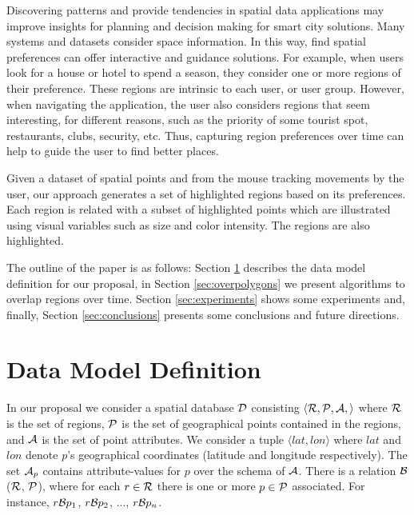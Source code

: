\documentclass[runningheads,a4paper]{llncs}
\begin{document}
\vspace{3pt}
Discovering patterns and provide tendencies in spatial data applications may improve insights for planning and decision making for smart city solutions. Many systems and datasets consider space information.  In this way, find spatial preferences can offer interactive and guidance solutions.  For example,  when users look for a house or hotel to spend a season, they consider one or more regions of their preference. These regions are intrinsic to each user, or user group. However, when navigating the application, the user also considers regions that seem interesting, for different reasons, such as the priority of some tourist spot, restaurants, clubs, security, etc. Thus, capturing region preferences over time can help to guide the user to find better places.
 
\vspace{3pt}
Given a dataset of spatial points and from the mouse tracking movements by the user, our approach generates a set of highlighted regions based on its preferences. Each region is related with a subset of highlighted points which are illustrated using visual variables such as size and color intensity. The regions are also highlighted.

\vspace{3pt}
The outline of the paper is as follows: Section \ref{sec:datamodel} describes the data model definition for our proposal, in Section \ref{sec:overpolygons}  we present algorithms to overlap regions over time. Section  \ref{sec:experiments}  shows some  experiments and, finally, Section \ref{sec:conclusions}  presents some conclusions and future directions. 

\section{Data Model Definition}
\label{sec:datamodel}

In our proposal we consider a spatial database ${\cal D}$ consisting $\langle {\cal R},  {\cal P}, {\cal A},  \rangle$ where ${\cal R}$ is the set of regions, ${\cal P}$ is the set of
geographical points contained in the regions, and ${\cal A}$ is the set of point attributes. We consider a tuple $\langle lat, lon\rangle$ where $lat$ and $lon$ denote $p$'s geographical coordinates (latitude and longitude  respectively). The set ${\cal A}_p$ contains attribute-values for $p$ over the schema of ${\cal A}$.  There is a relation ${\cal B}$ (${\cal R}$, ${\cal P}$), where for each $r \in	{\cal R}$ there is one or more $p \in {\cal P}$ associated. For instance, $r{\cal B}p_1$, $r{\cal B}p_2$, ..., $r{\cal B}p_n$.  
\end{document}
